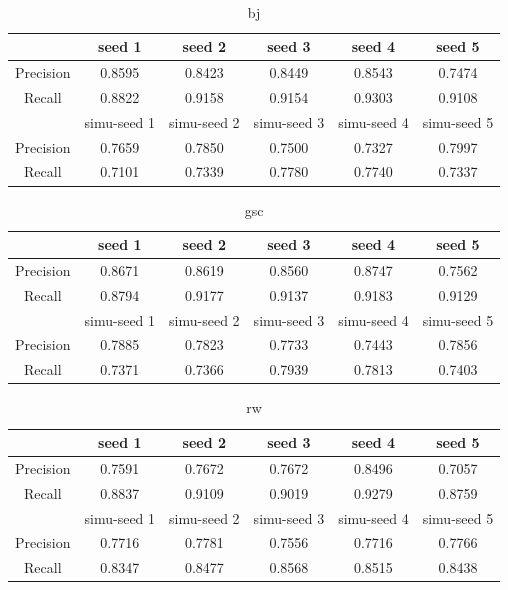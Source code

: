 \documentclass[runningheads,a4paper]{llncs}
\begin{document}
\paragraph{} 


\begin{table}
\centering
\begin{tabular}{|c|c|c|c|c|c|}
\hline
 & seed 1 & seed 2&seed 3&seed 4&seed 5 \\
\hline
Precision& 0.8595 & 0.8423 & 0.8449& 0.8543& 0.7474 \\
\hline
Recall& 0.8822 & 0.9158 & 0.9154& 0.9303& 0.9108 \\
\hline
 & simu-seed 1 & simu-seed 2&simu-seed 3&simu-seed 4&simu-seed 5 \\
 \hline
Precision& 0.7659 & 0.7850 & 0.7500& 0.7327& 0.7997 \\
\hline
Recall& 0.7101 & 0.7339 & 0.7780& 0.7740& 0.7337  \\
\hline
\end{tabular}
\caption{bj}
\end{table} 


\begin{table}
\centering
\begin{tabular}{|c|c|c|c|c|c|}
\hline
 & seed 1 & seed 2&seed 3&seed 4&seed 5 \\
  \hline
Precision& 0.8671 & 0.8619 & 0.8560& 0.8747& 0.7562 \\
\hline
Recall& 0.8794 & 0.9177 & 0.9137& 0.9183& 0.9129  \\
\hline
 & simu-seed 1 & simu-seed 2&simu-seed 3&simu-seed 4&simu-seed 5 \\
\hline
Precision& 0.7885 & 0.7823 & 0.7733& 0.7443& 0.7856 \\
\hline
Recall& 0.7371 & 0.7366 & 0.7939& 0.7813& 0.7403 \\
\hline
\end{tabular}
\caption{gsc}
\end{table} 


\begin{table}
\centering
\begin{tabular}{|c|c|c|c|c|c|}
\hline
 & seed 1 & seed 2&seed 3&seed 4&seed 5 \\
\hline
Precision& 0.7591 & 0.7672 & 0.7672& 0.8496& 0.7057 \\
\hline
Recall& 0.8837 & 0.9109 & 0.9019& 0.9279& 0.8759 \\
\hline
 & simu-seed 1 & simu-seed 2&simu-seed 3&simu-seed 4&simu-seed 5 \\
\hline
Precision& 0.7716 & 0.7781 & 0.7556& 0.7716& 0.7766 \\
\hline
Recall& 0.8347 & 0.8477 & 0.8568& 0.8515& 0.8438 \\
\hline
\end{tabular}
\caption{rw}
\end{table} 
\end{document}
